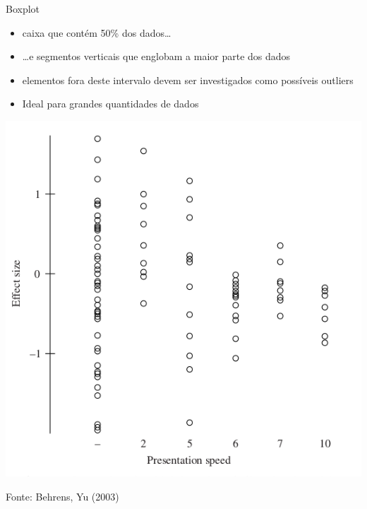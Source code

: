 \documentclass{beamer}
\begin{document}
\begin{frame}{Boxplot}
  \begin{itemize}
    \footnotesize
  \item caixa que contém 50\% dos dados\ldots
    \bigskip
  \item \ldots e segmentos verticais que englobam a maior parte dos
    dados
    \bigskip
  \item elementos fora deste intervalo devem ser investigados como
    possíveis outliers
    \bigskip
  \item Ideal para grandes quantidades de dados
  \end{itemize}
\end{frame}

\begin{frame}{}
  \begin{center}
    \includegraphics[height=0.7\textheight]{EDA/eda-boxplot1}
  \end{center}

  \vfill
  \scriptsize
  \hfill Fonte: Behrens, Yu (2003)
\end{frame}
\end{document}
